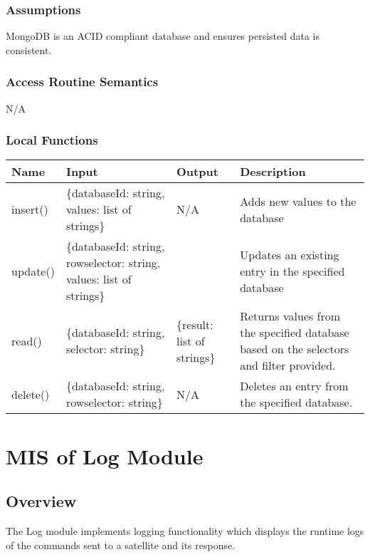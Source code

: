 \documentclass[12pt, titlepage]{article}
\begin{document}
\subsubsection{ Assumptions}

MongoDB is an ACID compliant database and ensures persisted data is consistent.

\subsubsection{ Access Routine Semantics}

N/A

\subsubsection{ Local Functions}
\begin{center}
\begin{tabular}{p{2cm} p{4cm} p{4cm} p{4cm}}
\hline
\textbf{Name} & \textbf{Input} & \textbf{Output} & \textbf{Description} \\
\hline
insert() & \{databaseId: string, values: list of strings\} & N/A & Adds new values to the database \\
\hline
update() & \{databaseId: string, rowselector: string, values: list of strings\} &  & Updates an existing entry in the specified database \\
\hline
read() & \{databaseId: string, selector: string\} & \{result: list of strings\} & Returns values from the specified database based on the selectors and filter provided. \\
\hline
delete() & \{databaseId: string, rowselector: string\} & N/A & Deletes an entry from the specified database. \\
\hline

\end{tabular}

\end{center}

\section{MIS of Log Module} \label{Module}

\subsection{ Overview}

The Log module implements logging functionality which displays the runtime logs of the commands sent to a satellite and its response.
\end{document}
